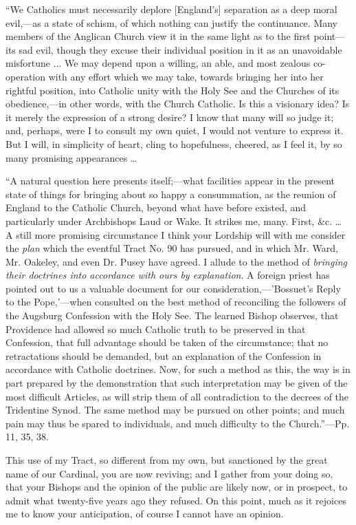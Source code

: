 ``We Catholics must necessarily deplore [England's] separation as a deep moral evil,—as a state of schism, of which
nothing can justify the continuance. Many members of the Anglican Church
view it in the same light as to the first point—its sad evil, though
they excuse their individual position in it as an unavoidable misfortune
... We may depend upon a willing, an able, and most zealous co-operation
with any effort which we may take, towards bringing her into her
rightful position, into Catholic unity with the Holy See and the
Churches of its obedience,—in other words, with the Church Catholic.
Is this a visionary idea? Is it merely the expression of a strong
desire? I know that many will so judge it; and, perhaps, were I to
consult my own quiet, I would not venture to express it. But I will, in
simplicity of heart, cling to hopefulness, cheered, as I feel it, by so
many promising appearances …

``A natural question here presents itself;—what facilities
appear in the present state of things for bringing about so happy a
consummation, as the reunion of England to the Catholic Church, beyond
what have before existed, and particularly under Archbishops Laud or
Wake. It strikes me, many. First, \&c. … A still more promising
circumstance I think your Lordship will with me consider the \emph{plan}
which the eventful Tract No. 90 has pursued, and in which Mr. Ward, Mr.
Oakeley, and even Dr. Pusey have agreed. I allude to the method of \emph{bringing
their doctrines into accordance with ours by explanation}. A foreign
priest has pointed out to us a valuable document for our consideration,—'Bossuet's
Reply to the Pope,'—when consulted on the best method of
reconciling the followers of the Augsburg Confession with the Holy See.
The learned Bishop observes, that Providence had allowed so much
Catholic truth to be preserved in that Confession, that full advantage
should be taken of the circumstance; that no retractations should be
demanded, but an explanation of the Confession in accordance with
Catholic doctrines. Now, for such a method as this, the way is in part
prepared by the demonstration that such interpretation may be given of
the most difficult Articles, as will strip them of all contradiction to
the decrees of the Tridentine Synod. The same method may be pursued on
other points; and much pain may thus be spared to individuals, and much
difficulty to the Church.''—Pp. 11, 35, 38.

This use of my Tract, so different from my own, but sanctioned by the
great name of our Cardinal, you are now reviving; and I gather from your
doing so, that your Bishops and the opinion of the public are likely
now, or in prospect, to admit what twenty-five years ago they refused.
On this point, much as it rejoices me to know your anticipation, of
course I cannot have an opinion.

